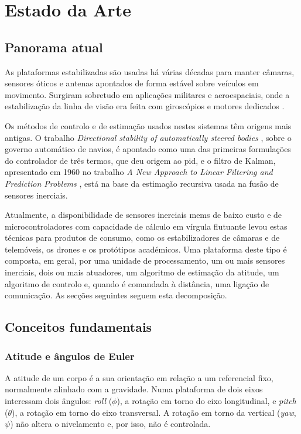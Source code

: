\chapter{Estado da Arte}
\label{ch:estado-arte}

\section{Panorama atual}
As plataformas estabilizadas são usadas há várias décadas para manter câmaras, sensores óticos e antenas apontados de forma estável sobre veículos em movimento. Surgiram sobretudo em aplicações militares e aeroespaciais, onde a estabilização da linha de visão era feita com giroscópios e motores dedicados \cite{hilkert2008,masten2008}.

Os métodos de controlo e de estimação usados nestes sistemas têm origens mais antigas. O trabalho \textit{Directional stability of automatically steered bodies} \cite{minorsky1922}, sobre o governo automático de navios, é apontado como uma das primeiras formulações do controlador de três termos, que deu origem ao \gls{pid}, e o filtro de Kalman, apresentado em 1960 no trabalho \textit{A New Approach to Linear Filtering and Prediction Problems} \cite{kalman1960}, está na base da estimação recursiva usada na fusão de sensores inerciais.

Atualmente, a disponibilidade de sensores inerciais \gls{mems} de baixo custo e de microcontroladores com capacidade de cálculo em vírgula flutuante levou estas técnicas para produtos de consumo, como os estabilizadores de câmaras e de telemóveis, os drones e os protótipos académicos. Uma plataforma deste tipo é composta, em geral, por uma unidade de processamento, um ou mais sensores inerciais, dois ou mais atuadores, um algoritmo de estimação da atitude, um algoritmo de controlo e, quando é comandada à distância, uma ligação de comunicação. As secções seguintes seguem esta decomposição.

\section{Conceitos fundamentais}

\subsection{Atitude e ângulos de Euler}
A atitude de um corpo é a sua orientação em relação a um referencial fixo, normalmente alinhado com a gravidade. Numa plataforma de dois eixos interessam dois ângulos: \textit{roll} ($\phi$), a rotação em torno do eixo longitudinal, e \textit{pitch} ($\theta$), a rotação em torno do eixo transversal. A rotação em torno da vertical (\textit{yaw}, $\psi$) não altera o nivelamento e, por isso, não é controlada.


